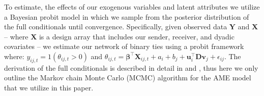 \documentclass[12pt,pdflatex]{elsarticle}
\begin{document}
To estimate, the effects of our exogenous variables and latent attributes we utilize a Bayesian probit model in which we sample from the posterior distribution of the full conditionals until convergence. Specifically, given observed data $\textbf{Y}$ and $\textbf{X}$ -- where $\textbf{X}$ is a design array that includes our sender, receiver, and dyadic covariates -- we estimate our network of binary ties using a probit framework where: $y_{ij,t} = 1(\theta_{ij,t}>0)$ and $\theta_{ij,t} = \bm\beta^{\top}\mathbf{X}_{ij,t} + a_{i} + b_{j} + \textbf{u}_{i}^{\top} \textbf{D} \textbf{v}_{j} + \epsilon_{ij}$. The derivation of the full conditionals is described in detail in \citet{hoff:2005} and \citet{hoff:2008}, thus here we only outline the Markov chain Monte Carlo (MCMC) algorithm for the AME model that we utilize in this paper.
\end{document}
